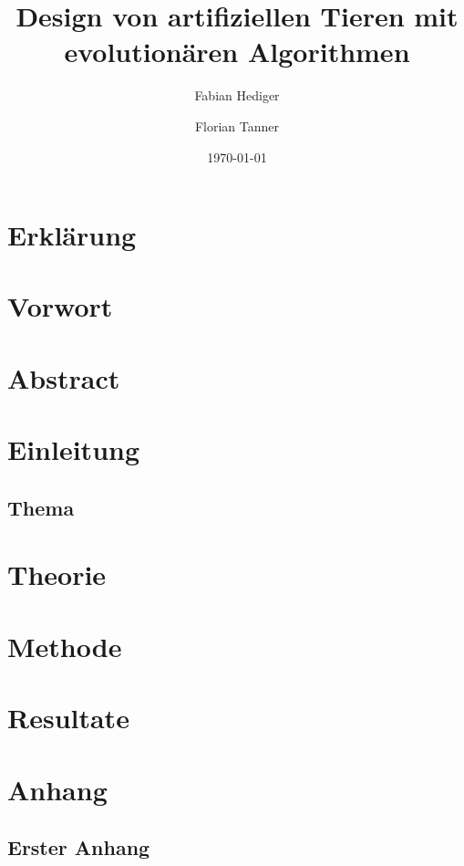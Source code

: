 %
%





  \title{Design von artifiziellen Tieren mit evolutionären Algorithmen}
  \author{Fabian Hediger \and Florian Tanner}
  \date{\today}

  \frontmatter

  
  

  \chapter{Erklärung}
  \lipsum[1]

  \chapter{Vorwort}
  \lipsum[2-3]

  \chapter{Abstract}
  \lipsum[3]

  \mainmatter

  \chapter{Einleitung}
  \lipsum[4-5]
  \section{Thema}
  \lipsum[5-6]

  \chapter{Theorie}
  \lipsum[6] \cite{IEEEexample:article_typical}
  \lipsum[7] \cite{mirrorcle_userguide}

  \chapter{Methode}
  \lipsum[8] \cite{microchip_spi} \cite{verryUseFulArticle}

  \chapter{Resultate}
  \lipsum[9]

  \appendix
  \chapter{Anhang}
  \section{Erster Anhang}

  \backmatter
  
  


